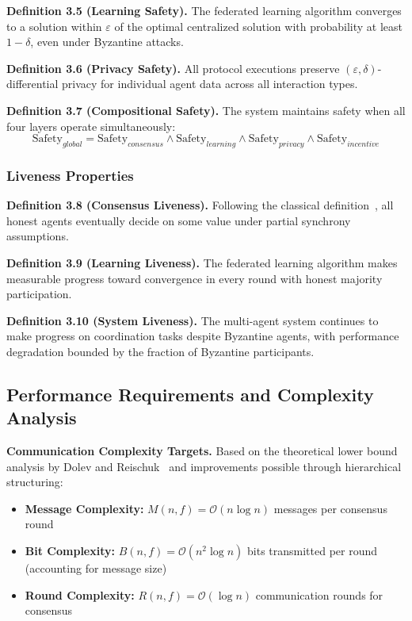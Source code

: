 \documentclass[conference]{IEEEtran}
\newcommand{\bigO}{\mathcal{O}}
\newcommand{\epsilon}{\varepsilon}
\begin{document}
\textbf{Definition 3.5 (Learning Safety).} The federated learning algorithm converges to a solution within $\epsilon$ of the optimal centralized solution with probability at least $1 - \delta$, even under Byzantine attacks.

\textbf{Definition 3.6 (Privacy Safety).} All protocol executions preserve $(\varepsilon, \delta)$-differential privacy for individual agent data across all interaction types.

\textbf{Definition 3.7 (Compositional Safety).} The system maintains safety when all four layers operate simultaneously:
$$\text{Safety}_{global} = \text{Safety}_{consensus} \land \text{Safety}_{learning} \land \text{Safety}_{privacy} \land \text{Safety}_{incentive}$$

\subsubsection{Liveness Properties}

\textbf{Definition 3.8 (Consensus Liveness).} Following the classical definition~\cite{fischer1985impossibility}, all honest agents eventually decide on some value under partial synchrony assumptions.

\textbf{Definition 3.9 (Learning Liveness).} The federated learning algorithm makes measurable progress toward convergence in every round with honest majority participation.

\textbf{Definition 3.10 (System Liveness).} The multi-agent system continues to make progress on coordination tasks despite Byzantine agents, with performance degradation bounded by the fraction of Byzantine participants.

\subsection{Performance Requirements and Complexity Analysis}

\textbf{Communication Complexity Targets.} Based on the theoretical lower bound analysis by Dolev and Reischuk~\cite{dolev1985bounds} and improvements possible through hierarchical structuring:
\begin{itemize}
    \item \textbf{Message Complexity:} $M(n, f) = \bigO(n \log n)$ messages per consensus round
    \item \textbf{Bit Complexity:} $B(n, f) = \bigO(n^2 \log n)$ bits transmitted per round (accounting for message size)
    \item \textbf{Round Complexity:} $R(n, f) = \bigO(\log n)$ communication rounds for consensus
\end{itemize}
\end{document}
